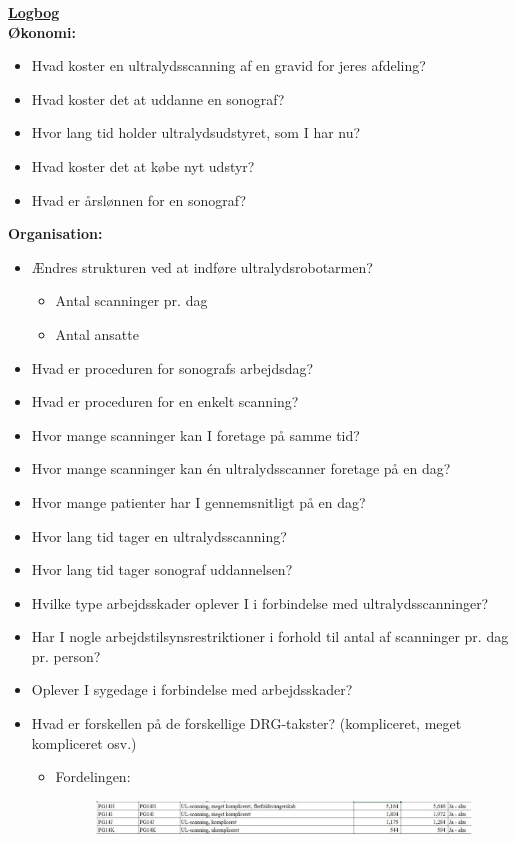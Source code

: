 \underline{\textbf{Logbog}}\\
\textbf{Økonomi:}
\begin{itemize}
\item Hvad koster en ultralydsscanning af en gravid for jeres afdeling?
\item Hvad koster det at uddanne en sonograf? 
\item Hvor lang tid holder ultralydsudstyret, som I har nu? 
\item Hvad koster det at købe nyt udstyr?
\item Hvad er årslønnen for en sonograf?
\end{itemize}
\textbf{Organisation:}
\begin{itemize}
\item Ændres strukturen ved at indføre ultralydsrobotarmen? 
\begin{itemize}
\item Antal scanninger pr. dag 
\item Antal ansatte
\end{itemize}
\item Hvad er proceduren for sonografs arbejdsdag?
\item Hvad er proceduren for en enkelt scanning?
\item Hvor mange scanninger kan I foretage på samme tid?
\item Hvor mange scanninger kan én ultralydsscanner foretage på en dag?
\item Hvor mange patienter har I gennemsnitligt på en dag? 
\item Hvor lang tid tager en ultralydsscanning?
\item Hvor lang tid tager sonograf uddannelsen?
\item Hvilke type arbejdsskader oplever I i forbindelse med ultralydsscanninger?
\item Har I nogle arbejdstilsynsrestriktioner i forhold til antal af scanninger pr. dag pr. person? 
\item Oplever I sygedage i forbindelse med arbejdsskader?
\item Hvad er forskellen på de forskellige DRG-takster? (kompliceret, meget kompliceret osv.)
\begin{itemize}
\item Fordelingen:
\begin{figure}[htb]
    \includegraphics{Figurer/scanning}
\end{figure}
\end{itemize}
\end{itemize}
